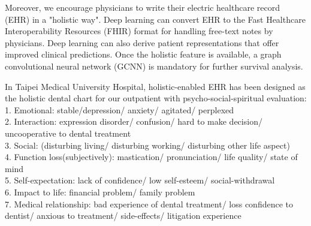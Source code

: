 \documentclass[12pt, a4paper]{article}
\begin{document}
Moreover, we encourage physicians to write their electric healthcare record (EHR) in a "holistic way".
Deep learning can convert EHR to the Fast Healthcare Interoperability Resources (FHIR) format\cite{Rajkomar2018}\cite{HealthLevelSeven2019} for handling free-text notes by physicians.
Deep learning can also derive patient representations that offer improved clinical predictions\cite{Miotto2016}.
Once the holistic feature is available, a graph convolutional neural network (GCNN) is mandatory for further survival analysis\cite{Ching2018a}.

In Taipei Medical University Hospital, holistic-enabled EHR has been designed as the holistic dental chart for our outpatient with psycho-social-spiritual evaluation\cite{Ling-ChengMong2021}:\\
1. Emotional: stable/depression/ anxiety/ agitated/ perplexed\\
2. Interaction: expression disorder/ confusion/ hard to make decision/ uncooperative to dental treatment\\
3. Social: (disturbing living/ disturbing working/ disturbing other life aspect)\\
4. Function loss(subjectively): mastication/ pronunciation/ life quality/ state of mind\\
5. Self-expectation: lack of confidence/ low self-esteem/ social-withdrawal\\
6. Impact to life: financial problem/ family problem\\
7. Medical relationship: bad experience of dental treatment/ loss confidence to dentist/ anxious to treatment/ side-effects/ litigation experience\\[0.1cm]
\end{document}
